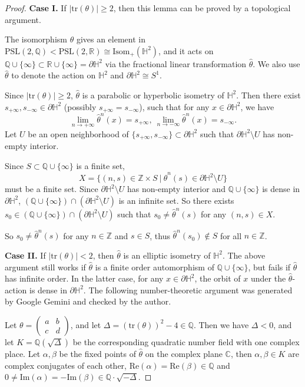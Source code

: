 \documentclass{amsart}
\numberwithin{equation}{section}
\theoremstyle{definition}
\begin{document}
\begin{proof}

{\bf Case I.} If $|\text{tr}(\theta)|\geq 2$, then this lemma can be proved by a topological argument. 

The isomorphism $\theta$ gives an element in $\text{PSL}(2,\mathbb{Q})<\text{PSL}(2,\mathbb{R})\cong \text{Isom}_+(\mathbb{H}^2)$, and it acts on $\mathbb{Q}\cup \{\infty\}\subset \mathbb{R}\cup \{\infty\}=\partial \mathbb{H}^2$ via the fractional linear transformation $\hat{\theta}$. We also use $\hat{\theta}$ to denote the action on $\mathbb{H}^2$ and $\partial \mathbb{H}^2\cong S^1$.

Since $|\text{tr}(\theta)|\geq 2$, $\hat{\theta}$ is a parabolic or hyperbolic isometry of $\mathbb{H}^2$. Then there exist $s_{+\infty},s_{-\infty}\in \partial \mathbb{H}^2$ (possibly $s_{+\infty}=s_{-\infty}$), such that for any $x\in \partial \mathbb{H}^2$, we have 
$$\lim_{n\to +\infty}\hat{\theta}^n(x)=s_{+\infty},\ \lim_{n\to -\infty}\hat{\theta}^n(x)=s_{-\infty}.$$
Let $U$ be an open neighborhood of $\{s_{+\infty},s_{-\infty}\}\subset \partial \mathbb{H}^2$ such that $\partial \mathbb{H}^2\setminus U$ has non-empty interior. 

Since $S\subset \mathbb{Q}\cup \{\infty\}$ is a finite set, 
$$X=\{(n,s)\in \mathbb{Z}\times S\ |\ \hat{\theta}^n(s)\in \partial \mathbb{H}^2\setminus U\}$$ must be a finite set. Since $\partial \mathbb{H}^2\setminus U$ has non-empty interior and $\mathbb{Q}\cup \{\infty\}$ is dense in $\partial \mathbb{H}^2$, $(\mathbb{Q}\cup \{\infty\})\cap (\partial \mathbb{H}^2\setminus U)$ is an infinite set. So
there exists $s_0\in (\mathbb{Q}\cup \{\infty\})\cap (\partial \mathbb{H}^2\setminus U)$ such that $s_0\ne \hat{\theta}^n(s)$ for any $(n,s)\in X$. 

So  $s_0\ne \hat{\theta}^n(s)$ for any $n\in \mathbb{Z}$ and $s\in S$, thus $\hat{\theta}^n(s_0)\notin S$ for all $n\in \mathbb{Z}$.

{\bf Case II.} If $|\text{tr}(\theta)|< 2$, then $\hat{\theta}$ is an elliptic isometry of $\mathbb{H}^2$. The above argument still works if $\hat{\theta}$ is a finite order automorphism of $\mathbb{Q}\cup \{\infty\}$, but fails if $\hat{\theta}$ has infinite order. In the latter case, for any $x\in \partial \mathbb{H}^2$, the orbit of $x$ under the $\hat{\theta}$-action is dense in $\partial \mathbb{H}^2$. The following number-theoretic argument was generated by Google Gemini and checked by the author.

Let $\theta=\begin{pmatrix}
a & b\\
c & d
\end{pmatrix}$, and let $\Delta=(\text{tr}(\theta))^2-4\in \mathbb{Q}$. Then we have $\Delta<0$, and let $K=\mathbb{Q}(\sqrt{\Delta})$ be the corresponding quadratic number field with one complex place. Let $\alpha,\beta$ be the fixed points of $\hat{\theta}$ on the complex plane $\mathbb{C}$, then $\alpha,\beta\in K$ are complex conjugates of each other, $\text{Re}(\alpha)=\text{Re}(\beta)\in \mathbb{Q}$ and $0\ne \text{Im}(\alpha)=-\text{Im}(\beta)\in \mathbb{Q}\cdot \sqrt{-\Delta}$.


\end{proof}
\end{document}
